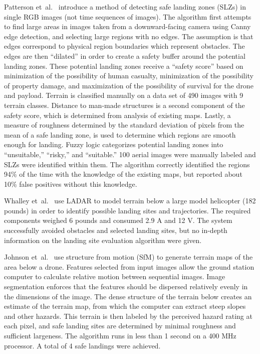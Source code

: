 Patterson et~al.~\cite{timely_landing_site_identification} introduce a method of detecting safe landing zones (SLZs) in single RGB images (not time sequences of images). The algorithm first attempts to find large areas in images taken from a downward-facing camera using Canny edge detection, and selecting large regions with no edges. The assumption is that edges correspond to physical region boundaries which represent obstacles. The edges are then ``dilated'' in order to create a safety buffer around the potential landing zones. These potential landing zones receive a ``safety score'' based on minimization of the possibility of human casualty, minimization of the possibility of property damage, and maximization of the possibility of survival for the drone and payload. Terrain is classified manually on a data set of 490 images with 9 terrain classes. Distance to man-made structures is a second component of the safety score, which is determined from analysis of existing maps. Lastly, a measure of roughness determined by the standard deviation of pixels from the mean of a safe landing zone, is used to determine which regions are smooth enough for landing. Fuzzy logic categorizes potential landing zones into ``unsuitable,'' ``risky,'' and ``suitable.'' 100 aerial images were manually labeled and SLZs were identified within them. The algorithm correctly identified the regions 94\% of the time with the knowledge of the existing maps, but reported about 10\% false positives without this knowledge.

Whalley et~al.~\cite{field_testing_helicopter} use LADAR to model terrain below a large model helicopter (182 pounds) in order to identify possible landing sites and trajectories. The required components weighed 6 pounds and consumed 2.9 A and 12 V. The system successfully avoided obstacles and selected landing sites, but no in-depth information on the landing site evaluation algorithm were given.

Johnson et~al.~\cite{helicopter_hazardous_terrain} use structure from motion (SfM) to generate terrain maps of the area below a drone. Features selected from input images allow the ground station computer to calculate relative motion between sequential images. Image segmentation enforces that the features should be dispersed relatively evenly in the dimensions of the image. The dense structure of the terrain below creates an estimate of the terrain map, from which the computer can extract steep slopes and other hazards. This terrain is then labeled by the perceived hazard rating at each pixel, and safe landing sites are determined by minimal roughness and sufficient largeness. The algorithm runs in less than 1 second on a 400 MHz processor. A total of 4 safe landings were achieved.

